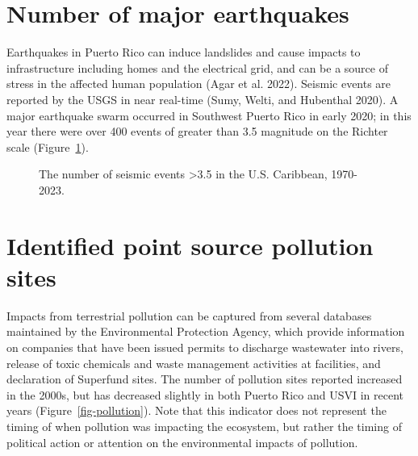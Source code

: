 \documentclass[
  letterpaper,
  oneside,
  open=any]{scrbook}
\begin{document}
\section{Number of major earthquakes}\label{number-of-major-earthquakes}

Earthquakes in Puerto Rico can induce landslides and cause impacts to
infrastructure including homes and the electrical grid, and can be a
source of stress in the affected human population (Agar et al. 2022).
Seismic events are reported by the USGS in near real-time (Sumy, Welti,
and Hubenthal 2020). A major earthquake swarm occurred in Southwest
Puerto Rico in early 2020; in this year there were over 400 events of
greater than 3.5 magnitude on the Richter scale
(Figure~\ref{fig-quakes}).

\begin{figure}


\caption{\label{fig-quakes}The number of seismic events \textgreater3.5
in the U.S. Caribbean, 1970-2023.}

\end{figure}%

\section{Identified point source pollution
sites}\label{identified-point-source-pollution-sites}

Impacts from terrestrial pollution can be captured from several
databases maintained by the Environmental Protection Agency, which
provide information on companies that have been issued permits to
discharge wastewater into rivers, release of toxic chemicals and waste
management activities at facilities, and declaration of Superfund sites.
The number of pollution sites reported increased in the 2000s, but has
decreased slightly in both Puerto Rico and USVI in recent years
(Figure~\ref{fig-pollution}). Note that this indicator does not
represent the timing of when pollution was impacting the ecosystem, but
rather the timing of political action or attention on the environmental
impacts of pollution.
\end{document}
